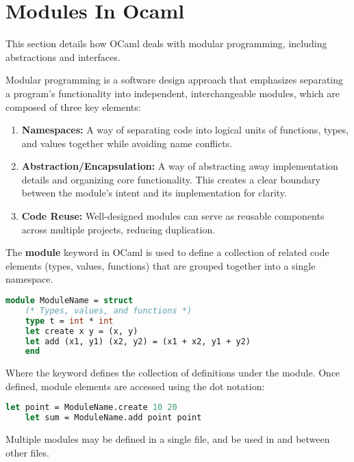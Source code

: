 \section{Modules In Ocaml}

This section details how OCaml deals with modular programming, including abstractions and interfaces.

\begin{Def}

Modular programming is a software design approach that emphasizes separating a program's functionality into independent, interchangeable modules,
which are composed of three key elements:

\begin{enumerate}
    \item \textbf{Namespaces:} A way of separating code into logical units of functions, types, and values together while avoiding name conflicts.
    
    \item \textbf{Abstraction/Encapsulation:} A way of abstracting away implementation details and organizing core functionality. This creates a clear boundary between the module's intent and its implementation for clarity.
    
    \item \textbf{Code Reuse:} Well-designed modules can serve as reusable components across multiple projects, reducing duplication.
\end{enumerate}

\end{Def}

\begin{Def}

    The \textbf{module} keyword in OCaml is used to define a collection of related code elements (types, values, functions) that are grouped together into a single namespace.

    \begin{lstlisting}[language=OCaml, numbers=none, caption= \textbf{Basic Module Syntax:}]
    module ModuleName = struct
    (* Types, values, and functions *)
    type t = int * int
    let create x y = (x, y)
    let add (x1, y1) (x2, y2) = (x1 + x2, y1 + y2)
    end
    \end{lstlisting}

    \noindent
    Where the  keyword defines the collection of
    definitions under the module.
    Once defined, module elements are accessed using the dot notation:
    \begin{lstlisting}[language=OCaml, numbers=none]
    let point = ModuleName.create 10 20
    let sum = ModuleName.add point point
    \end{lstlisting}

    \noindent
    Multiple modules may be defined in a single file, and be used in and between other files.

\end{Def}

